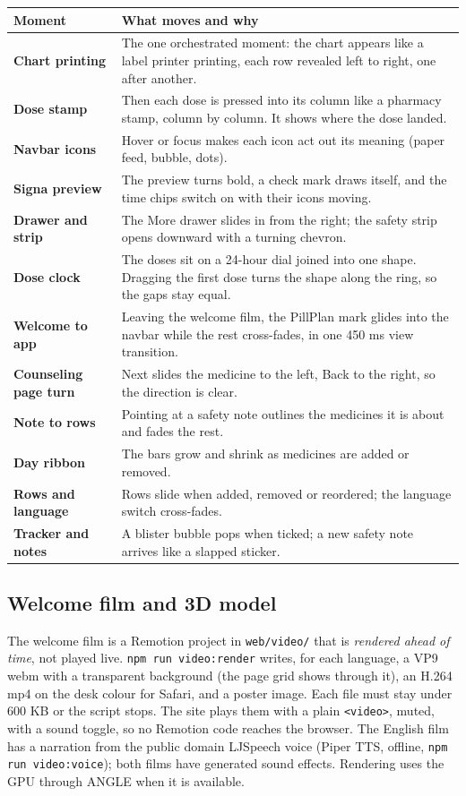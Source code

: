 \documentclass[11pt]{article}
\begin{document}
\begin{tabularx}{\linewidth}{@{}>{\bfseries}p{38mm}X@{}}
\toprule
Moment & What moves and why \\
\midrule
Chart printing & The one orchestrated moment: the chart appears like a label printer printing, each row revealed left to right, one after another. \\
Dose stamp & Then each dose is pressed into its column like a pharmacy stamp, column by column. It shows where the dose landed. \\
Navbar icons & Hover or focus makes each icon act out its meaning (paper feed, bubble, dots). \\
Signa preview & The preview turns bold, a check mark draws itself, and the time chips switch on with their icons moving. \\
Drawer and strip & The More drawer slides in from the right; the safety strip opens downward with a turning chevron. \\
Dose clock & The doses sit on a 24-hour dial joined into one shape. Dragging the first dose turns the shape along the ring, so the gaps stay equal. \\
Welcome to app & Leaving the welcome film, the PillPlan mark glides into the navbar while the rest cross-fades, in one 450 ms view transition. \\
Counseling page turn & Next slides the medicine to the left, Back to the right, so the direction is clear. \\
Note to rows & Pointing at a safety note outlines the medicines it is about and fades the rest. \\
Day ribbon & The bars grow and shrink as medicines are added or removed. \\
Rows and language & Rows slide when added, removed or reordered; the language switch cross-fades. \\
Tracker and notes & A blister bubble pops when ticked; a new safety note arrives like a slapped sticker. \\
\bottomrule
\end{tabularx}

\subsection{Welcome film and 3D model}
The welcome film is a Remotion project in \texttt{web/video/} that is \emph{rendered ahead of time}, not played live. \texttt{npm run video:render} writes, for each language, a VP9 webm with a transparent background (the page grid shows through it), an H.264 mp4 on the desk colour for Safari, and a poster image. Each file must stay under 600 KB or the script stops. The site plays them with a plain \texttt{<video>}, muted, with a sound toggle, so no Remotion code reaches the browser. The English film has a narration from the public domain LJSpeech voice (Piper TTS, offline, \texttt{npm run video:voice}); both films have generated sound effects. Rendering uses the GPU through ANGLE when it is available.
\end{document}
